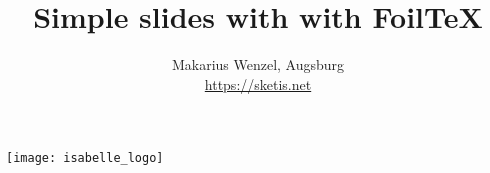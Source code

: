 \documentclass[a4paper,landscape]{foils}
\newcommand{\titlestyle}{\color{DarkGreen}}
\begin{document}
\title{\titlestyle Simple slides with with FoilTeX}
\author{Makarius Wenzel, Augsburg \\ \url{https://sketis.net}}
\date{}
\maketitle

\vfill

\begin{center}
  \texttt{[image: isabelle\_logo]}
\end{center}

\vfill


\end{document}
